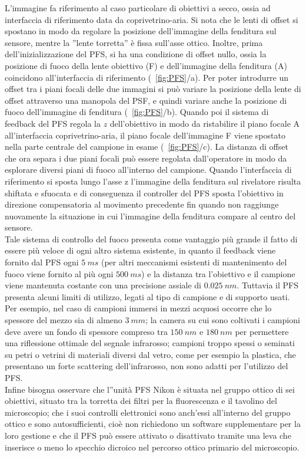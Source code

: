 \begin{itemize}
L'immagine fa riferimento al caso particolare di obiettivi a secco, ossia ad interfaccia di riferimento data da coprivetrino-aria. Si nota che le lenti di offset si spostano in modo da regolare la posizione dell'immagine della fenditura sul sensore, mentre la ''lente torretta'' è fissa sull'asse ottico. Inoltre, prima dell'inizializzazione del PFS, si ha una condizione di offset nullo, ossia la posizione di fuoco della lente obiettivo (F) e dell'immagine della fenditura (A) coincidono all'interfaccia di riferimento (\figurename~\ref{fig:PFS}/a). Per poter introdurre un offset tra i piani focali delle due immagini si può variare la posizione della lente di offset attraverso una manopola del PSF, e quindi variare anche la posizione di fuoco dell'immagine di fenditura (\figurename~\ref{fig:PFS}/b). Quando poi il sistema di feedback del PFS regola la $z$ dell'obiettivo in modo da ristabilire il piano focale A all'interfaccia coprivetrino-aria, il piano focale dell'immagine F viene spostato nella parte centrale del campione in esame (\figurename~\ref{fig:PFS}/c). La distanza di offset che ora separa i due piani focali può essere regolata dall'operatore in modo da esplorare diversi piani di fuoco all'interno del campione. Quando l'interfaccia di riferimento si sposta lungo l'asse z l'immagine della fenditura sul rivelatore risulta shiftata e sfuocata e di conseguenza il controller del PFS sposta l'obiettivo in direzione compensatoria al movimento precedente fin quando non raggiunge nuovamente la situazione in cui l'immagine della fenditura compare al centro del sensore. \\
Tale sistema di controllo del fuoco presenta come vantaggio più grande il fatto di essere più veloce di ogni altro sistema esistente, in quanto il feedback viene fornito dal PFS ogni $5\ ms$ (per altri meccanismi esistenti di mantenimento del fuoco viene fornito al più ogni $500\ ms$) e la distanza tra l'obiettivo e il campione viene mantenuta costante con una precisione assiale di $0.025\ nm$. Tuttavia il PFS presenta alcuni limiti di utilizzo, legati al tipo di campione e di supporto usati. Per esempio, nel caso di campioni immersi in mezzi acquosi occorre che lo spessore del mezzo sia di almeno $3\ mm$; la camera su cui sono coltivati i campioni deve avere un fondo di spessore compreso tra $150\ nm$ e $180\ nm$ per permettere una riflessione ottimale del segnale infrarosso; campioni troppo spessi o seminati su petri o vetrini di materiali diversi dal vetro, come per esempio la plastica, che presentano un forte scattering dell'infrarosso, non sono adatti per l'utilizzo del PFS. \\
Infine bisogna osservare che l''unità PFS Nikon è situata nel gruppo ottico di sei obiettivi, situato tra la torretta dei filtri per la fluorescenza e il tavolino del microscopio; che i suoi controlli elettronici sono anch'essi all'interno del gruppo ottico e sono autosufficienti, cioè non richiedono un software supplementare per la loro gestione e che il PFS può essere attivato o disattivato tramite una leva che inserisce o meno lo specchio dicroico nel percorso ottico primario del microscopio.\\


\end{itemize}
